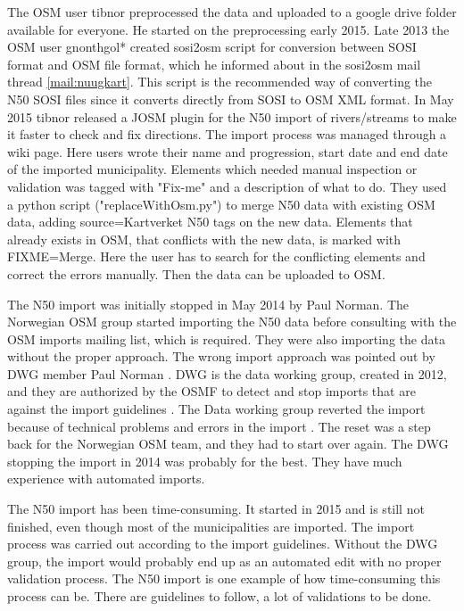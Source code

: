 The OSM user tibnor preprocessed the data and uploaded to a google drive folder available for everyone. He started on the preprocessing early 2015. Late 2013 the OSM user gnonthgol* created sosi2osm script for conversion between SOSI format and OSM file format, which he informed about in the sosi2osm mail thread \ref{mail:nuugkart}. This script is the recommended way of converting the N50 SOSI files since it converts directly from SOSI to OSM XML format. In May 2015 tibnor released a JOSM plugin for the N50 import of rivers/streams to make it faster to check and fix directions. The import process was managed through a wiki page. Here users wrote their name and progression, start date and end date of the imported municipality. Elements which needed manual inspection or validation was tagged with "Fix-me" and a description of what to do. They used a python script ("replaceWithOsm.py") to merge N50 data with existing OSM data, adding source=Kartverket N50 tags on the new data. Elements that already exists in OSM, that conflicts with the new data, is marked with FIXME=Merge. Here the user has to search for the conflicting elements and correct the errors manually. Then the data can be uploaded to OSM. 

The N50 import was initially stopped in May 2014 by Paul Norman. The Norwegian OSM group started importing the N50 data before consulting with the OSM imports mailing list, which is required. They were also importing the data without the proper approach. The wrong import approach was pointed out by DWG member Paul Norman \cite{Mehus2014}.  DWG is the data working group, created in 2012, and they are authorized by the OSMF to detect and stop imports that are against the import guidelines \cite{OSMDWG}. The Data working group reverted the import because of technical problems and errors in the import \cite{Didriksen2014}. The reset was a step back for the Norwegian OSM team, and they had to start over again. The DWG stopping the import in 2014 was probably for the best. They have much experience with automated imports. 

The N50 import has been time-consuming. It started in 2015 and is still not finished, even though most of the municipalities are imported. The import process was carried out according to the import guidelines. Without the DWG group, the import would probably end up as an automated edit with no proper validation process. The N50 import is one example of how time-consuming this process can be. There are guidelines to follow, a lot of validations to be done. %

